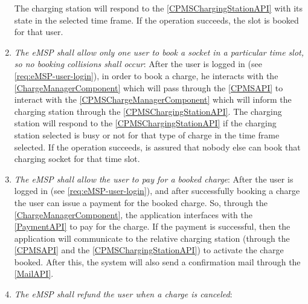 \begin{enumerate}[label=\textbf{R\arabic*}]
            The charging station will respond to the \ref{CPMSChargingStationAPI} with its state in the selected time frame. If the operation succeeds, the slot is booked for that user.
            \label{req:eMSP-reserve-socket}
      \item \textit{The \ac{eMSP} shall allow only one user to book a socket in a particular time slot, so no booking collisions shall occur}:
            After the user is logged in (see \ref{req:eMSP-user-login}), in order to book a charge, he interacts with the \ref{ChargeManagerComponent} which will pass through the \ref{CPMSAPI} to interact with the \ref{CPMSChargeManagerComponent} which will inform the charging station through the \ref{CPMSChargingStationAPI}.
            The charging station will respond to the \ref{CPMSChargingStationAPI} if the charging station selected is busy or not for that type of charge in the time frame selected. If the operation succeeds, is assured that nobody else can book that charging socket for that time slot.
            \label{req:eMSP-no-book-collisions}
      \item \textit{The \ac{eMSP} shall allow the user to pay for a booked charge}:
            After the user is logged in (see \ref{req:eMSP-user-login}), and after successfully booking a charge the user can issue a payment for the booked charge.
            So, through the \ref{ChargeManagerComponent}, the application interfaces with the \ref{PaymentAPI} to pay for the charge. If the payment is successful, then the application will communicate to the relative charging station (through the \ref{CPMSAPI} and the \ref{CPMSChargingStationAPI}) to activate the charge booked.
            After this, the system will also send a confirmation mail through the \ref{MailAPI}.
            \label{req:eMSP-payment}
      \item \textit{The \ac{eMSP} shall refund the user when a charge is canceled}:

\end{enumerate}
